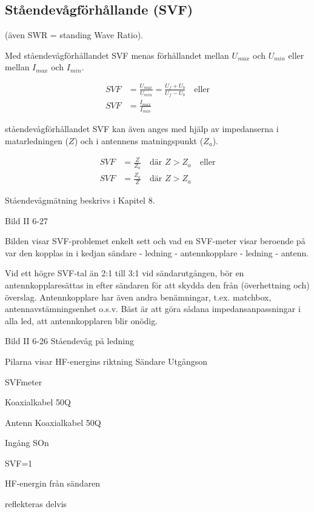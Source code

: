 \subsection{Ståendevågförhållande (SVF)}

(även SWR = standing Wave Ratio).

Med ståendevågförhållandet SVF menas förhållandet mellan \(U_{max}\)
och \(U_{min}\) eller mellan \(I_{max}\) och \(I_{min}\).

\begin{align*}
  SVF &= \frac{U_{max}}{U_{min}} = \frac{U_f + U_b}{U_f - U_b} \quad
  \text{eller} \\
  SVF &= \frac{I_{max}}{I_{min}}
\end{align*}

ståendevågförhållandet SVF kan även anges med hjälp av impedanserna i
matarledningen (\(Z\)) och i antennens matningspunkt (\(Z_a\)).

\begin{align*}
  SVF &= \frac{Z}{Z_a} \quad \text{där } Z > Z_a \quad \text{eller} \\
  SVF &= \frac{Z_a}{Z} \quad \text{där } Z > Z_a
\end{align*}

Ståendevågmätning beskrivs i Kapitel 8.

Bild II 6-27

Bilden visar SVF-problemet enkelt sett och vad en SVF-meter visar
beroende på var den kopplas in i kedjan sändare - ledning -
antennkopplare - ledning - antenn.

Vid ett högre SVF-tal än 2:1 till 3:1 vid sändarutgången, bör en
antennkopplaresättas in efter sändaren för att skydda den från
(överhettning och) överslag. Antennkopplare har även andra
benämningar, t.ex. matchbox, antennavstämningsenhet o.s.v. Bäst är att
göra sådana impedansanpassningar i alla led, att antennkopplaren blir
onödig.


Bild II 6-26 Ståendevåg på ledning

Pilarna visar HF-energins riktning
Sändare
Utgångson

SVFmeter

Koaxialkabel 50Q

Antenn
Koaxialkabel 50Q

Ingång SOn

SVF=1

HF-energin från sändaren

reflekteras delvis

